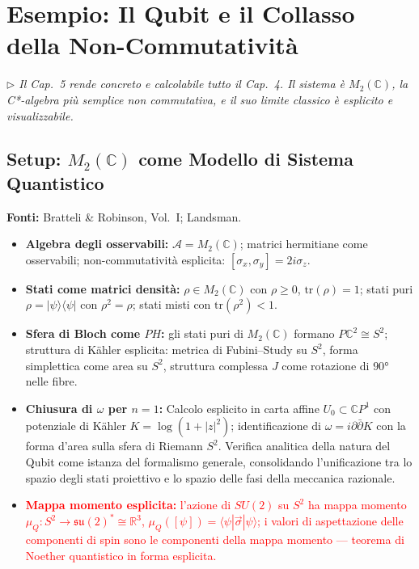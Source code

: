 \documentclass[12pt, a4paper]{article}
\newcommand{\fonti}[1]{%
	\begin{fontebox}
		\textcolor{fontecolor}{\footnotesize\textbf{Fonti:} #1}
	\end{fontebox}%
}
\newcommand{\nota}[1]{%
	\par\smallskip
	\noindent\textit{\small $\triangleright$\; #1}
	\par\smallskip
}
\begin{document}
	\section{Esempio: Il Qubit e il Collasso della Non-Commutatività}
	
	\nota{Il Cap.~5 rende concreto e calcolabile tutto il Cap.~4. Il sistema è $M_2(\mathbb{C})$, la C*-algebra più semplice non commutativa, e il suo limite classico è esplicito e visualizzabile.}
	
	\subsection{Setup: $M_2(\mathbb{C})$ come Modello di Sistema Quantistico}
	
	\fonti{Bratteli \& Robinson, Vol.~I; Landsman.}
	
	\begin{itemize}
		\item \textbf{Algebra degli osservabili:} $\mathcal{A} = M_2(\mathbb{C})$; matrici hermitiane come osservabili; non-commutatività esplicita: $[\sigma_x, \sigma_y] = 2i\sigma_z$.
		\item \textbf{Stati come matrici densità:} $\rho \in M_2(\mathbb{C})$ con $\rho \geq 0$, $\text{tr}(\rho) = 1$; stati puri $\rho = |\psi\rangle\langle\psi|$ con $\rho^2=\rho$; stati misti con $\text{tr}(\rho^2) < 1$.
		\item \textbf{Sfera di Bloch come $PH$:} gli stati puri di $M_2(\mathbb{C})$ formano $P\mathbb{C}^2 \cong S^2$; struttura di Kähler esplicita: metrica di Fubini--Study su $S^2$, forma simplettica come area su $S^2$, struttura complessa $J$ come rotazione di $90°$ nelle fibre.
		
		\item \textbf{Chiusura di $\omega$ per $n=1$:} Calcolo esplicito in carta affine $U_0 \subset \mathbb{C}P^1$ con potenziale di Kähler $K = \log(1+|z|^2)$; identificazione di $\omega = i\partial\bar{\partial}K$ con la forma d'area sulla sfera di Riemann $S^2$. Verifica analitica della natura del Qubit come istanza del formalismo generale, consolidando l'unificazione tra lo spazio degli stati proiettivo e lo spazio delle fasi della meccanica razionale.
		
		\item \textcolor{red}{\textbf{Mappa momento esplicita:} l'azione di $SU(2)$ su $S^2$ ha mappa momento $\mu_Q: S^2 \to \mathfrak{su}(2)^* \cong \mathbb{R}^3$, $\mu_Q([\psi]) = \langle\psi|\vec{\sigma}|\psi\rangle$; i valori di aspettazione delle componenti di spin sono le componenti della mappa momento --- teorema di Noether quantistico in forma esplicita.}
	\end{itemize}
	
\end{document}
